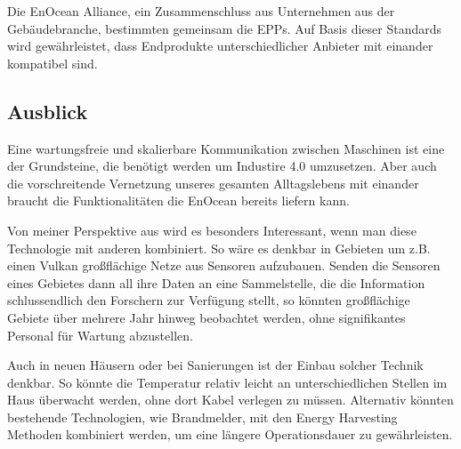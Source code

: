 \begin{multicols}{3}
Die EnOcean Alliance, ein Zusammenschluss aus Unternehmen aus der Gebäudebranche, bestimmten gemeinsam die EPPs. Auf Basis dieser Standards wird gewährleistet, dass Endprodukte unterschiedlicher Anbieter mit einander kompatibel sind. 

\subsection*{Ausblick}
Eine wartungsfreie und skalierbare Kommunikation zwischen Maschinen ist eine der Grundsteine, die benötigt werden um Industire 4.0 umzusetzen. Aber auch die vorschreitende Vernetzung unseres gesamten Alltagslebens mit einander braucht die Funktionalitäten die EnOcean bereits liefern kann. 

Von meiner Perspektive aus wird es besonders Interessant, wenn man diese Technologie mit anderen kombiniert. So wäre es denkbar in Gebieten um z.B. einen Vulkan großflächige Netze aus Sensoren aufzubauen. Senden die Sensoren eines Gebietes dann all ihre Daten an eine Sammelstelle, die die Information schlussendlich den Forschern zur Verfügung stellt, so könnten großflächige Gebiete über mehrere Jahr hinweg beobachtet werden, ohne signifikantes Personal für Wartung abzustellen.

Auch in neuen Häusern oder bei Sanierungen ist der Einbau solcher Technik denkbar. So könnte die Temperatur relativ leicht an unterschiedlichen Stellen im Haus überwacht werden, ohne dort Kabel verlegen zu müssen. Alternativ könnten bestehende Technologien, wie Brandmelder, mit den Energy Harvesting Methoden kombiniert werden, um eine längere Operationsdauer zu gewährleisten.

\printbibliography[segment=16,heading=subbibliography]
\end{multicols}
\newpage
